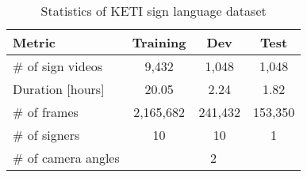 \documentclass[10pt,twocolumn,letterpaper]{article}
\begin{document}




\begin{table}[htb]\label{tab:dataset}
\centering
\begin{tabular}{@{  }p{3.1cm}ccc@{  }} 
\toprule
Metric  & Training & Dev & Test\\ \midrule
\# of sign videos  & 9,432 & 1,048 & 1,048  \\ 
Duration [hours]  & 20.05 & 2.24 & 1.82\\
\# of frames  & 2,165,682 & 241,432 & 153,350\\
\# of signers  & 10 & 10 & 1\\ 
\# of camera angles  & \multicolumn{3}{c}{2}\\ 
\bottomrule
\end{tabular}
\caption{Statistics of KETI sign language dataset}
\end{table}
\end{document}
